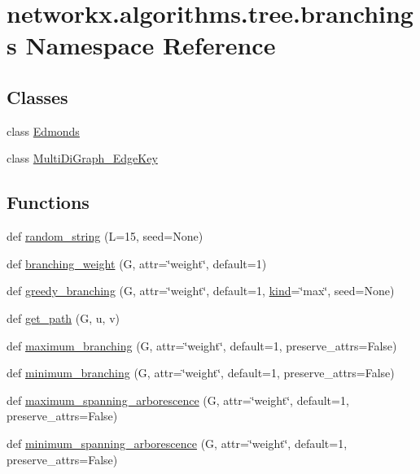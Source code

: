 \hypertarget{namespacenetworkx_1_1algorithms_1_1tree_1_1branchings}{}\section{networkx.\+algorithms.\+tree.\+branchings Namespace Reference}
\label{namespacenetworkx_1_1algorithms_1_1tree_1_1branchings}
\subsection*{Classes}
\begin{DoxyCompactItemize}
\item 
class \hyperlink{classnetworkx_1_1algorithms_1_1tree_1_1branchings_1_1Edmonds}{Edmonds}
\item 
class \hyperlink{classnetworkx_1_1algorithms_1_1tree_1_1branchings_1_1MultiDiGraph__EdgeKey}{Multi\+Di\+Graph\+\_\+\+Edge\+Key}
\end{DoxyCompactItemize}
\subsection*{Functions}
\begin{DoxyCompactItemize}
\item 
def \hyperlink{namespacenetworkx_1_1algorithms_1_1tree_1_1branchings_a676835135eb355e2c4ca7628d1d51638}{random\+\_\+string} (L=15, seed=None)
\item 
def \hyperlink{namespacenetworkx_1_1algorithms_1_1tree_1_1branchings_a4757ee21411f45850b3efaa62c2fe102}{branching\+\_\+weight} (G, attr=\char`\"{}weight\char`\"{}, default=1)
\item 
def \hyperlink{namespacenetworkx_1_1algorithms_1_1tree_1_1branchings_a4faacb709c09e382dc3c796e4ea2d63c}{greedy\+\_\+branching} (G, attr=\char`\"{}weight\char`\"{}, default=1, \hyperlink{namespacenetworkx_1_1algorithms_1_1tree_1_1branchings_a939088c3886c1538f95830ca98488f79}{kind}=\char`\"{}max\char`\"{}, seed=None)
\item 
def \hyperlink{namespacenetworkx_1_1algorithms_1_1tree_1_1branchings_a344967dc01dab415c2bdbd9220177b1d}{get\+\_\+path} (G, u, v)
\item 
def \hyperlink{namespacenetworkx_1_1algorithms_1_1tree_1_1branchings_a9b552352c9fefd824b96d8f5fd589472}{maximum\+\_\+branching} (G, attr=\char`\"{}weight\char`\"{}, default=1, preserve\+\_\+attrs=False)
\item 
def \hyperlink{namespacenetworkx_1_1algorithms_1_1tree_1_1branchings_aa0f228dede13947c4d002b7c2ce5bd6a}{minimum\+\_\+branching} (G, attr=\char`\"{}weight\char`\"{}, default=1, preserve\+\_\+attrs=False)
\item 
def \hyperlink{namespacenetworkx_1_1algorithms_1_1tree_1_1branchings_a7dc17b4f2b3ba69710440a7d409d85bc}{maximum\+\_\+spanning\+\_\+arborescence} (G, attr=\char`\"{}weight\char`\"{}, default=1, preserve\+\_\+attrs=False)
\item 
def \hyperlink{namespacenetworkx_1_1algorithms_1_1tree_1_1branchings_a7f8019e6075ffc0849eaf1d35fab3296}{minimum\+\_\+spanning\+\_\+arborescence} (G, attr=\char`\"{}weight\char`\"{}, default=1, preserve\+\_\+attrs=False)
\end{DoxyCompactItemize}

